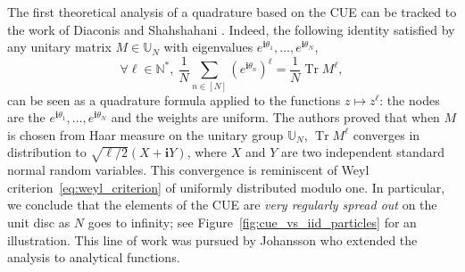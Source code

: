 \documentclass[twoside,11pt]{book}
\numberwithin{theorem}{chapter}
\numberwithin{definition}{chapter}
\numberwithin{proposition}{chapter}
\numberwithin{corollary}{chapter}
\numberwithin{example}{chapter}
\numberwithin{lemma}{chapter}
\numberwithin{assumption}{chapter}
\DeclareMathOperator{\Tr}{Tr}
\begin{document}





The first theoretical analysis of a  quadrature based on the CUE can be tracked to the work of Diaconis and Shahshahani \citep{DiSh94}. Indeed, the following identity satisfied by any unitary matrix $M \in \mathbb{U}_{N}$ with eigenvalues $e^{\mathbf{i} \theta_{1}}, \dots, e^{\mathbf{i} \theta_{N}}$,
\begin{equation}
\forall \ell \in \mathbb{N}^{*}, \: \frac{1}{N} \sum\limits_{n \in [N]} (e^{\mathbf{i} \theta_{n}})^{\ell} = \frac{1}{N} \Tr M^{\ell},
\end{equation}
can be seen as a quadrature formula applied to the functions $z \mapsto z^{\ell}$: the nodes are the $e^{\mathbf{i} \theta_{1}}, \dots, e^{\mathbf{i} \theta_{N}}$ and the weights are uniform.
  The authors proved that when $M$ is chosen from Haar measure on the unitary group $\mathbb{U}_{N}$, $\Tr M^{\ell} $ converges in distribution to $\sqrt{\ell/2}(X+\mathbf{i} Y)$, where $X$ and $Y$ are two independent standard normal random variables. 
  This convergence is reminiscent of Weyl criterion~\eqref{eq:weyl_criterion} of uniformly distributed modulo one. In particular, we conclude that the elements of the CUE are \emph{very regularly spread out} on the unit disc as $N$ goes to infinity; see Figure~\ref{fig:cue_vs_iid_particles} for an illustration. This line of work was pursued by Johansson who extended the analysis to analytical functions.
\end{document}
